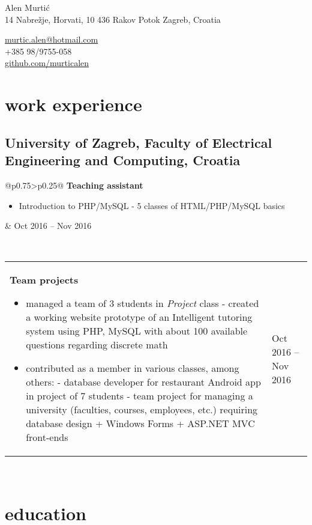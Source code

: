 \documentclass[a4paper]{article}
\makeatletter
\newlength{\tablewidth}
\newenvironment{period}[2]{%
\newcommand{\sarma}{#2}%
\setlength{\tablewidth}{\linewidth}
\addtolength{\tablewidth}{-2\tabcolsep}
\begin{tabular}{@{}p{0.75\tablewidth}>{\raggedleft\arraybackslash}p{0.25\tablewidth}@{}}%
#1 \newline
\begin{itemize}
}{%
\end{itemize} & \sarma \\%
\end{tabular}\\
}
\makeatother
\begin{document}
\fontfamily{\sfdefault}
\selectfont

\begin{minipage}{.5\textwidth}
\LARGE{Alen Murtić}\\
\normalsize{14 Nabrežje, Horvati, 10 436 Rakov Potok
	\newline
	Zagreb, Croatia}
\end{minipage}%
\begin{minipage}{.5\textwidth}
\raggedleft
\href{mailto:murtic.alen@hotmail.com}{murtic.alen@hotmail.com} \\
+385 98/9755-058 \\
\href{https://github.com/murticalen}{github.com/murticalen}
\end{minipage}

\vspace{1em}

\section{work experience}

\subsection{University of Zagreb, Faculty of Electrical Engineering and Computing, Croatia}
\begin{period}{\textbf{Teaching assistant}}{Oct 2016 -- Nov 2016}
	\item Introduction to PHP/MySQL - 5 classes of HTML/PHP/MySQL basics
\end{period}
\begin{period}{\textbf{Team projects}}{}
	\item managed a team of 3 students in \textit{Project} class
	\newline
	- created a working website prototype of an Intelligent tutoring system using PHP, MySQL with about 100 available questions regarding discrete math
	\item contributed as a member in various classes, among others:
	\newline
	- database developer for restaurant Android app in project of 7 students
	\newline
	- team project for managing a university (faculties, courses, employees, etc.) requiring database design + Windows Forms + ASP.NET MVC front-ends
\end{period}

\section{education}
\end{document}
